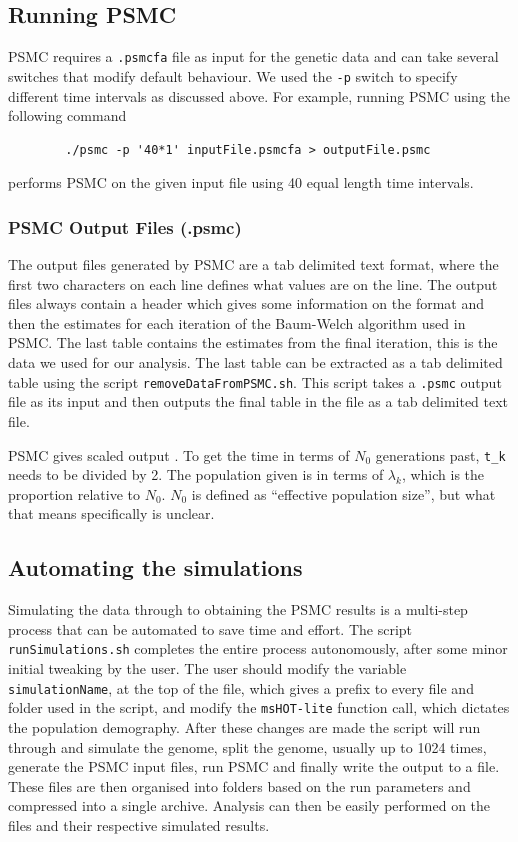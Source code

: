 \documentclass[11pt,a4paper]{article}
\begin{document}
\subsection{Running PSMC}
PSMC requires a \verb|.psmcfa| file as input for the genetic data and can take several switches that modify default behaviour. We used the \verb|-p| switch to specify different time intervals as discussed above. For example, running PSMC using the following command
\begin{verbatim}
		./psmc -p '40*1' inputFile.psmcfa > outputFile.psmc
\end{verbatim}
performs PSMC on the given input file using 40 equal length time intervals.

\subsubsection{PSMC Output Files (.psmc)}
The output files generated by PSMC are a tab delimited text format, where the first two characters on each line defines what values are on the line. The output files always contain a header which gives some information on the format and then the estimates for each iteration of the Baum-Welch algorithm used in PSMC. The last table contains the estimates from the final iteration, this is the data we used for our analysis. The last table can be extracted as a tab delimited table using the script \verb|removeDataFromPSMC.sh|. This script takes a \verb|.psmc| output file as its input and then outputs the final table in the file as a tab delimited text file.

PSMC gives scaled output \cite{li2011inference}. To get the time in terms of $N_0$ generations past, \verb|t_k| needs to be divided by 2. The population given is in terms of $\lambda_k$, which is the proportion relative to $N_0$. $N_0$ is defined as ``effective population size'', but what that means specifically is unclear.

\subsection{Automating the simulations}

Simulating the data through to obtaining the PSMC results is a multi-step process that can be automated to save time and effort. The script \verb|runSimulations.sh| completes the entire process autonomously, after some minor initial tweaking by the user. The user should modify the variable \verb|simulationName|, at the top of the file, which gives a prefix to every file and folder used in the script, and modify the \verb|msHOT-lite| function call, which dictates the population demography. After these changes are made the script will run through and simulate the genome, split the genome, usually up to 1024 times, generate the PSMC input files, run PSMC and finally write the output to a file. These files are then organised into folders based on the run parameters and compressed into a single archive. Analysis can then be easily performed on the files and their respective simulated results.
\end{document}
